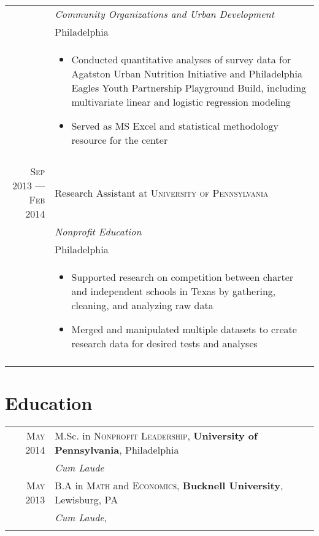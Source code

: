 \documentclass[a4paper,10pt]{article}
\begin{document}
\begin{tabular}{r|p{11cm}}
 &\emph{Community Organizations and Urban Development}\\
 &Philadelphia\\
 &\footnotesize{\begin{itemize}
 		\item{Conducted quantitative analyses of survey data for Agatston Urban Nutrition Initiative and Philadelphia Eagles Youth Partnership Playground Build, including multivariate linear and logistic  regression modeling}
 		\item{Served as MS Excel and statistical methodology resource for the center}
 	\end{itemize}}\\\multicolumn{2}{c}{} \\	
\textsc{Sep 2013 --- Feb 2014} & Research Assistant at \textsc{University of Pennsylvania}\\
&\emph{Nonprofit Education}\\
&Philadelphia\\
&\footnotesize{\begin{itemize}
		\item{Supported research on competition between charter and independent schools in Texas by gathering, cleaning, and analyzing raw data}
		\item{Merged and manipulated multiple datasets to create research data for desired tests and analyses}
	\end{itemize}}\\\multicolumn{2}{c}{} \\	
\end{tabular}
\newpage
\section{Education}
\begin{tabular}{rl}	
 \textsc{May} 2014 & M.Sc. in \textsc{Nonprofit Leadership}, \textbf{University of Pennsylvania}, Philadelphia\\
& \small\emph{Cum Laude} \\
\textsc{May} 2013& B.A in \textsc{Math} and \textsc{Economics}, \normalsize\textbf{Bucknell University}, Lewisburg, PA \\& \small\emph{Cum Laude}, \\\\
\end{tabular}

\end{document}
